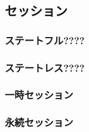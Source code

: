     \subsection{セッション}
        \subsubsection{ステートフル????}
        \subsubsection{ステートレス????}
        \subsubsection{一時セッション}%
        \subsubsection{永続セッション}%
